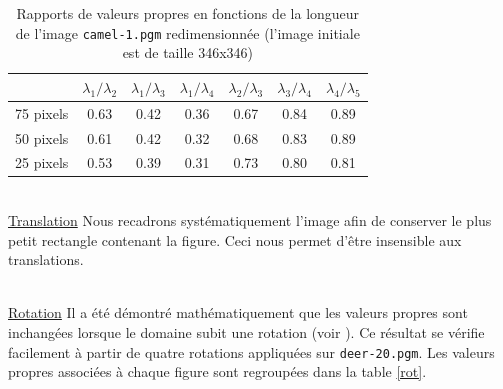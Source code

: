 \documentclass[a4paper,10pt]{article} %
\theoremstyle{definition} %
\begin{document}
\begin{table}[H]
  \begin{center}
    \begin{tabular}{l | c c c c c c}
                & $\lambda_1 / \lambda_2$ & $\lambda_1 / \lambda_3$ & $\lambda_1 / \lambda_4$ & $\lambda_2 / \lambda_3$ & $\lambda_3 / \lambda_4$ & $\lambda_4 / \lambda_5$ \\ \hline
      75 pixels & 0.63 & 0.42 & 0.36 & 0.67 & 0.84 & 0.89 \\
      50 pixels & 0.61 & 0.42 & 0.32 & 0.68 & 0.83 & 0.89 \\
      25 pixels & 0.53 & 0.39 & 0.31 & 0.73 & 0.80 & 0.81
    \end{tabular}
  \end{center}
\caption{Rapports de valeurs propres en fonctions de la longueur de l'image \texttt{camel-1.pgm} redimensionnée (l'image initiale est de taille 346x346)}
\label{scale}
\end{table}

~\\
\underline{Translation} Nous recadrons systématiquement l'image afin de conserver le plus petit rectangle contenant la figure. Ceci nous permet d'être insensible aux translations.

~\\
\underline{Rotation} Il a été démontré mathématiquement que les valeurs propres sont inchangées lorsque le domaine subit une rotation (voir \cite{Zuliani04}). 
Ce résultat se vérifie facilement à partir de quatre rotations appliquées sur \texttt{deer-20.pgm}. Les valeurs propres associées à chaque figure sont regroupées dans la table \ref{rot}.
\end{document}
